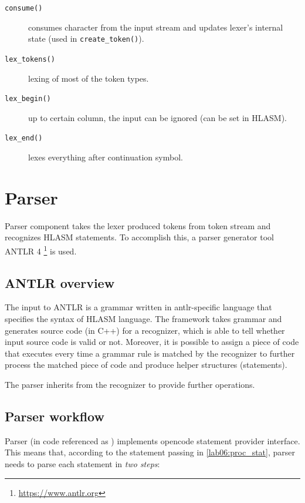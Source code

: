 \begin{description}
\begin{description}
		\item[\texttt{consume()}] consumes character from the input stream and updates lexer's internal state (used in \texttt{create\_token()}).
		
		\item[\texttt{lex\_tokens()}] lexing of most of the token types.
		
		\item[\texttt{lex\_begin()}] up to certain column, the input can be ignored (can be set in HLASM).
		
		\item[\texttt{lex\_end()}] lexes everything after continuation symbol.
		
		
	\end{description}
	
\end{description}


\section{Parser}
\label{lab06:parser}

Parser component takes the lexer produced tokens from token stream and recognizes HLASM statements. To accomplish this, a parser generator tool ANTLR 4 \footnote{\url{https://www.antlr.org}} is used.

\subsection{ANTLR overview}

The input to ANTLR is a grammar written in antlr-specific language that specifies the syntax of HLASM language. The framework takes grammar and generates source code (in C++) for a recognizer, which is able to tell whether input source code is valid or not. Moreover, it is possible to assign a piece of code that executes every time a grammar rule is matched by the recognizer to further process the matched piece of code and produce helper structures (statements).

The parser inherits from the recognizer to provide further operations.

\subsection{Parser workflow}

Parser (in code referenced as ) implements opencode statement provider interface. This means that, according to the statement passing in \cref{lab06:proc_stat}, parser needs to parse each statement in \emph{two steps}:

